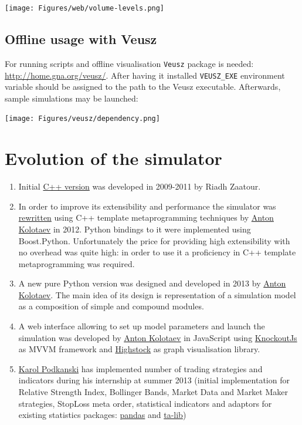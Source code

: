 \documentclass[a4paper,11pt]{article}
\begin{document}
\centerline{\texttt{[image: Figures/web/volume-levels.png]}}

\subsection{Offline usage with Veusz}\label{offline-usage-with-veusz}

For running scripts and offline visualisation \texttt{Veusz} package is
needed: \url{http://home.gna.org/veusz/}. After having it installed
\texttt{VEUSZ\_EXE} environment variable should be assigned to the path
to the Veusz executable. Afterwards, sample simulations may be launched:

\centerline{\texttt{[image: Figures/veusz/dependency.png]}}

\section{Evolution of the simulator}\label{evolution-of-the-simulator}

\begin{enumerate}
\def\labelenumi{\arabic{enumi}.}
\itemsep1pt\parskip0pt
\item
  Initial
  \href{http://sourceforge.net/p/marketsimulator/svn/HEAD/tree/Simulator/}{C++
  version} was developed in 2009-2011 by Riadh Zaatour.
\item
  In order to improve its extensibility and performance the simulator
  was \href{https://github.com/antonkolotaev/v2}{rewritten} using C++
  template metaprogramming techniques by
  \href{https://github.com/antonkolotaev}{Anton Kolotaev} in 2012.
  Python bindings to it were implemented using Boost.Python.
  Unfortunately the price for providing high extensibility with no
  overhead was quite high: in order to use it a proficiency in C++
  template metaprogramming was required.
\item
  A new pure Python version was designed and developed in 2013 by
  \href{https://github.com/antonkolotaev}{Anton Kolotaev}. The main idea
  of its design is representation of a simulation model as a composition
  of simple and compound modules. 
\item
  A web interface allowing to set up model parameters and launch the
  simulation was developed by
  \href{https://github.com/antonkolotaev}{Anton Kolotaev} in JavaScript
  using \href{http://knockoutjs.com/}{KnockoutJs} as MVVM framework and
  \href{http://www.highcharts.com/products/highstock}{Highstock} as
  graph visualisation library.
\item
  \href{https://github.com/koalainparis}{Karol Podkanski} has
  implemented number of trading strategies and indicators during his
  internship at summer 2013 (initial implementation for Relative
  Strength Index, Bollinger Bands, Market Data and Market Maker
  strategies, StopLoss meta order, statistical indicators and adaptors
  for existing statistics packages:
  \href{http://pandas.pydata.org/}{pandas} and
  \href{http://ta-lib.org/}{ta-lib})
\end{enumerate}
\end{document}
